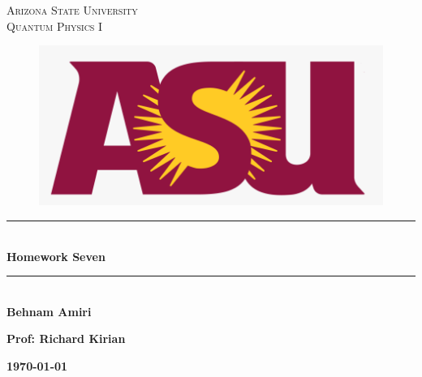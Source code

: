 \documentclass[fleqn]{article}
\begin{document}
  \begin{titlepage}

    \newcommand{\HRule}{\rule{\linewidth}{0.5mm}}

    \center


    \textsc{\LARGE Arizona State University}\\[1.5cm]

    \textsc{\LARGE Quantum Physics I }\\[1.5cm]


    \begin{figure}
      \includegraphics[width=\linewidth]{asu.png}
    \end{figure}


    \HRule \\[0.4cm]
    { \huge \bfseries Homework Seven}\\[0.4cm] 
    \HRule \\[1.5cm]

    \textbf{Behnam Amiri}

    \bigbreak

    \textbf{Prof: Richard Kirian}

    \bigbreak


    \textbf{{\large \today}\\[2cm]}

    \vfill 

  \end{titlepage}
\end{document}
